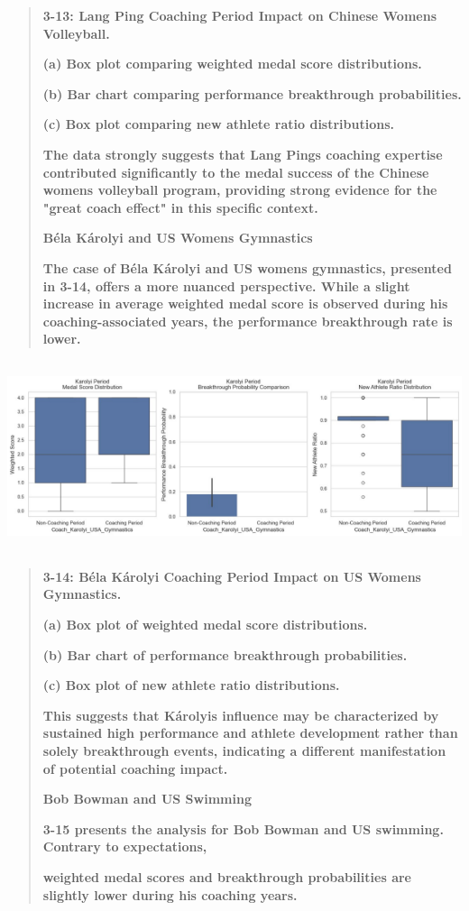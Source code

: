 \documentclass[12pt,a4paper]{article}
\renewenvironment{quote}{\begin{quotation}}{\end{quotation}}  %
\begin{document}
    \begin{quote}
    \textbf{3-13: Lang Ping Coaching Period Impact on Chinese
    Women\textquotesingle s Volleyball.}
    
    \textbf{(a) Box plot comparing weighted medal score distributions.}
    
    \textbf{(b) Bar chart comparing performance breakthrough probabilities.}
    
    \textbf{(c) Box plot comparing new athlete ratio distributions.}
    
    \textbf{The data strongly suggests that Lang Ping\textquotesingle s
    coaching expertise contributed significantly to the medal success of the
    Chinese women\textquotesingle s volleyball program, providing strong
    evidence for the "great coach effect" in this specific context.}
    
    \textbf{Béla Károlyi and US Women\textquotesingle s Gymnastics}
    
    \textbf{The case of Béla Károlyi and US women\textquotesingle s
    gymnastics, presented in 3-14, offers a more nuanced perspective. While
    a slight increase in average weighted medal score is observed during his
    coaching-associated years, the performance breakthrough rate is lower.}
    \end{quote}
    
    \includegraphics[width=6.29833in,height=2.20167in]{./media/media/image23.png}
    
    \begin{quote}
    \textbf{3-14: Béla Károlyi Coaching Period Impact on US
    Women\textquotesingle s Gymnastics.}
    
    \textbf{(a) Box plot of weighted medal score distributions.}
    
    \textbf{(b) Bar chart of performance breakthrough probabilities.}
    
    \textbf{(c) Box plot of new athlete ratio distributions.}
    
    \textbf{This suggests that Károlyi\textquotesingle s influence may be
    characterized by sustained high performance and athlete development
    rather than solely breakthrough events, indicating a different
    manifestation of potential coaching impact.}
    
    \textbf{Bob Bowman and US Swimming}
    
    \textbf{3-15 presents the analysis for Bob Bowman and US swimming.
    Contrary to expectations,}
    
    \textbf{weighted medal scores and breakthrough probabilities are
    slightly lower during his coaching years.}
    \end{quote}
    
\end{document}
